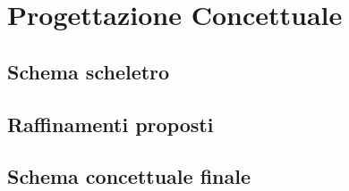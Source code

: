 \section{Progettazione Concettuale}
\subsection{Schema scheletro}

\subsection{Raffinamenti proposti}

\subsection{Schema concettuale finale}
